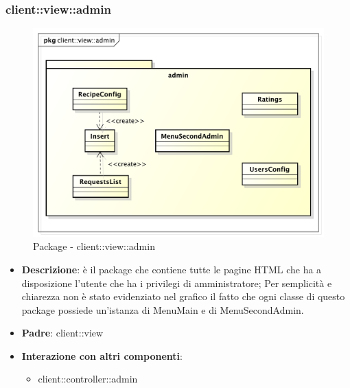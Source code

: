 \subsubsection{client::view::admin} %
\label{ssub:bdsm_app_client_view_admin}
\begin{figure}[htbp]
	\centering
	\centerline{\includegraphics[scale=0.5]{./images/client/client_view_admin.pdf}}
	\caption{Package - client::view::admin}
\end{figure}

\begin{itemize}
	\item \textbf{Descrizione}: è il package che contiene tutte le pagine HTML che ha a disposizione l'utente che ha i privilegi di amministratore;\newline
	Per semplicità e chiarezza non è stato evidenziato nel grafico il fatto che ogni classe di questo package possiede un'istanza di MenuMain e di MenuSecondAdmin.
	\item \textbf{Padre}: client::view
	\item \textbf{Interazione con altri componenti}:
		\begin{itemize}
			\item client::controller::admin
		\end{itemize}
\end{itemize}

